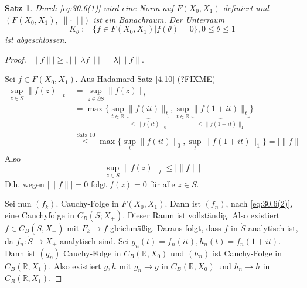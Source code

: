 \documentclass[
paper=a4,
bibtotocnumbered,
liststotocnumbered,
tablecaptionabove,
pointlessnumbers,
twoside,
openright,
10pt
]
{report}
\newtheorem{satz}[thm]{Satz}
\theoremstyle{definition}
\numberwithin{equation}{chapter}
\begin{document}
\begin{satz}\label{4.11}
Durch \eqref{eq:30.6(1)} wird eine Norm auf $F(X_0, X_1)$ definiert und $(F(X_0, X_1), |\| \cdot \| |)$ ist ein Banachraum. Der Unterraum
\begin{equation}
K_{\theta} := \{ f\in F(X_0, X_1) | f(\theta)=0\}, 0 \le \theta \le 1
\end{equation}
ist abgeschlossen.
\end{satz}
\begin{proof}
$|\| f\| | \ge, | \| \lambda f \| | = | \lambda | \| f\|.$

Sei $f\in F(X_0, X_1)$. Aus Hadamard Satz \ref{4.10} (?FIXME)
\begin{align*}
\sup_{z\in S} \| f(z)\|_t &= \sup_{z\in \partial S} \| f(z)\|_t\\
&= \max \{ \sup_{t\in \mathbb R} \underbrace{\| f(it)\|_t}_{\le \| f(it)\|_0}, \sup_{t\in \mathbb R} \underbrace{\| f(1+it)\|_t}_{\le \| f(1+it)\|_1}\}\\
&\stackrel{\text{Satz 10}}\le \max\{\sup_t \| f(it)\|_0, \sup_t \| f(1+it)\|_1\} = | \| f\| |
\end{align*} 
Also 
\begin{equation}\label{eq:30.6(2)}
\sup_{z\in S} \| f(z)\|_t\le |\| f\| |
\end{equation}
D.h. wegen $|\| f\| | =0$  folgt $f(z)=0$ für alle $z\in S$.

Sei nun $(f_k)$. Cauchy-Folge in $F(X_0, X_1)$. Dann ist $(f_n)$, nach \eqref{eq:30.6(2)}, eine Cauchyfolge in $C_B(S; X_+)$. Dieser Raum ist vollständig. Also existiert $f\in C_B(S, X_+)$ mit $F_k \to f$ gleichmäßig. Daraus folgt, dass $f$ in $\mathring S$ analytisch ist, da $f_n: \mathring S \to X_+$ analytisch sind. Sei $g_n(t) = f_n(it), h_n(t) = f_n(1+it)$. Dann ist $(g_n)$ Cauchy-Folge in $C_B(\mathbb R, X_0)$ und $(h_n)$ ist Cauchy-Folge in $C_B(\mathbb R, X_1)$. Also existiert  $g,h$ mit $g_n \to g$ in $C_B(\mathbb R, X_0)$ und $h_n \to h$ in $C_B(\mathbb R, X_1)$.


\end{proof}
\end{document}
